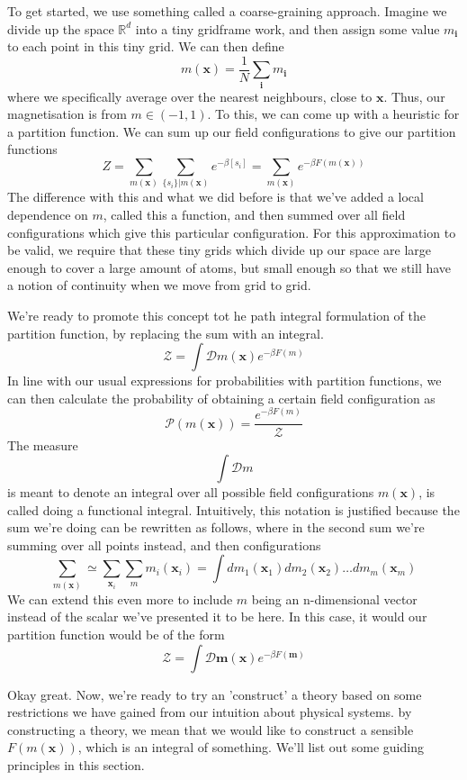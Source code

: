 \documentclass[11pt, oneside]{article}   	%
\newcommand{\ve}[1]{ \mathbf{#1} }
\begin{document}
To get started, we use something called a coarse-graining approach. Imagine we divide up the space $\mathbb{R}^d$ into a tiny gridframe work, and then assign some value $m_{\mathbf{i}}$ to each point in this tiny grid. We can then define 
\[
m(\mathbf{x}) = \frac{1}{N} \sum_{\mathbf{i}} m_\mathbf{i}
\] where we specifically average over the nearest neighbours, close to $\mathbf{x}$. Thus, our magnetisation is from $m \in ( -1, 1 )$. To this, we can come up with a heuristic for a partition function. We can sum up our field configurations to give our partition functions
\[ 
Z = \sum_{m ( \mathbf{x} )} \sum_{ \{ s_i \} | m ( \mathbf{x} ) } e^{  - \beta [ s_i ] }  = \sum_{ m ( \mathbf{x} )}  e^{ - \beta F ( m ( \mathbf{x} )) } 
\] The difference with this and what we did before is that we've added a local dependence on $m$, called this a function, and then summed over all field configurations which give this particular configuration. For this approximation to be valid, we require that these tiny grids which divide up our space are large enough to cover a large amount of atoms, but small enough so that we still have a notion of continuity when we move from grid to grid. 

We're ready to promote this concept tot he path integral formulation of the partition function, by replacing the sum with an integral. 
\[
\mathcal{Z} = \int \mathcal{D}m(\mathbf{x})e^{ - \beta F(m)}
\]
In line with our usual expressions for probabilities with partition functions, we can then calculate the probability of obtaining a certain field configuration as 
\[ 
\mathcal{P} ( m ( \mathbf{x} ) )  = \frac{ e^{  - \beta F( m ) } }{ \mathcal{Z} } 
\] 
The measure
\[
\int \mathcal{D}m 
\] is meant to denote an integral over all possible field configurations $m(\mathbf{x})$, is called doing a functional integral. Intuitively, this notation is justified because the sum we're doing can be rewritten as follows, where in the second sum we're summing over all points instead, and then configurations
\[ 
\sum_{ m ( \mathbf{x} )}   \simeq \sum_{ \mathbf{x}_i }  \sum_m m_i ( \mathbf{x}_i )  = \int dm_1( \mathbf{x}_1 ) dm_2 ( \mathbf{x}_2 ) \dots dm_m ( \mathbf{x}_m ) 
\] 
We can extend this even more to include $m$ being an n-dimensional vector instead of the scalar we've presented it to be here. In this case, it would our partition function would be of the form 
\[
\mathcal{Z} = \int \mathcal{D}  \mathbf{m}(\mathbf{x}) e^{ - \beta F(\mathbf{m})} 
\]

Okay great. Now, we're ready to try an 'construct' a theory based on some restrictions we have gained from our intuition about physical systems. by constructing a theory, we mean that we would like to construct a sensible $F ( m ( \ve{x } ) ) $, which is an integral of something.  We'll list out some guiding principles in this section. 
\end{document}
